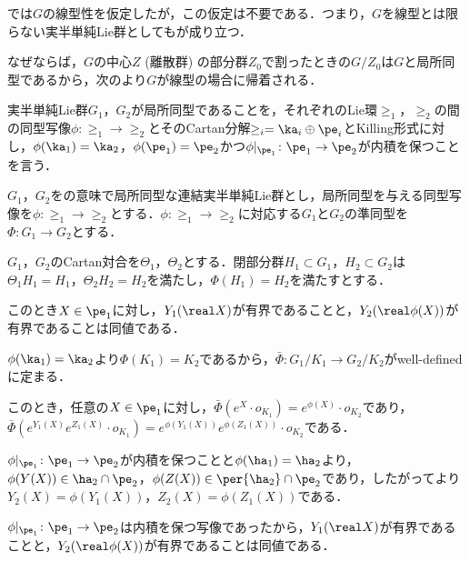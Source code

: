 \begin{rem}
  では$G$の線型性を仮定したが，この仮定は不要である．つまり，$G$を線型とは限らない実半単純Lie群としてもが成り立つ．

  なぜならば，$G$の中心$Z$ (離散群) の部分群$Z_0$で割ったときの$G/Z_0$は$G$と局所同型であるから，次のより$G$が線型の場合に帰着される．

  \begin{defi}\label{def:loc-isom}
    実半単純Lie群$G_1$，$G_2$が局所同型であることを，それぞれのLie環$\ge_1$，$\ge_2$の間の同型写像$\phi\colon \ge_1\to \ge_2$とそのCartan分解$\ge_i = \ka_i\oplus \pe_i $とKilling形式に対し，$\phi(\ka_1) = \ka_2 $，$\phi(\pe_1) = \pe_2 $かつ$\phi|_{\pe_1} \colon \pe_1\to \pe_2$が内積を保つことを言う．
  \end{defi}

  \begin{lem}\label{lem:loc-isom}
    $G_1$，$G_2$をの意味で局所同型な連結実半単純Lie群とし，局所同型を与える同型写像を$\phi\colon \ge_1\to \ge_2$とする．$\phi\colon \ge_1\to \ge_2$に対応する$G_1$と$G_2$の準同型を$\Phi\colon G_1\to G_2$とする．

    $G_1$，$G_2$のCartan対合を$\Theta_1$，$\Theta_2$とする．閉部分群$H_1\subset G_1$，$H_2\subset G_2$は$\Theta_1H_1 = H_1$，$\Theta_2H_2 = H_2$を満たし，$\Phi(H_1) = H_2 $を満たすとする．

    このとき$X\in \pe_1$に対し，$Y_1(\real X) $が有界であることと，$Y_2(\real \phi(X)) $が有界であることは同値である．
  \end{lem}
  \begin{npfwn}{}
    $\phi(\ka_1) = \ka_2 $より$\Phi(K_1) = K_2 $であるから，$\bar{\Phi}\colon G_1/K_1\to G_2/K_2 $がwell-definedに定まる．

    このとき，任意の$X\in \pe_1$に対し，$\bar{\Phi}(e^X\cdot o_{K_1}) = e^{\phi(X)}\cdot o_{K_2} $であり，$\bar{\Phi}(e^{Y_1(X)}e^{Z_1(X)}\cdot o_{K_1}) = e^{\phi(Y_1(X))}e^{\phi(Z_1(X))}\cdot o_{K_2} $である．

    $\phi|_{\pe_1} \colon \pe_1\to \pe_2$が内積を保つことと$\phi(\ha_1) = \ha_2 $より，$\phi(Y(X))\in \ha_2\cap \pe_2 $，$\phi(Z(X))\in \per{\ha_2}\cap \pe_2 $であり，したがってより$Y_2(X) = \phi(Y_1(X)) $，$Z_2(X) = \phi(Z_1(X)) $である．

    $\phi|_{\pe_1} \colon \pe_1\to \pe_2$は内積を保つ写像であったから，$Y_1(\real X) $が有界であることと，$Y_2(\real \phi(X)) $が有界であることは同値である．
  \end{npfwn}
\end{rem}


